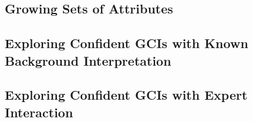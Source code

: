 \subsection{Growing Sets of Attributes}
\label{sec:grow-sets-attr-1}

\subsection{Exploring Confident GCIs with Known Background Interpretation}
\label{sec:expl-conf-gcis}

\subsection{Exploring Confident GCIs with Expert Interaction}
\label{sec:expl-conf-gcis-1}

